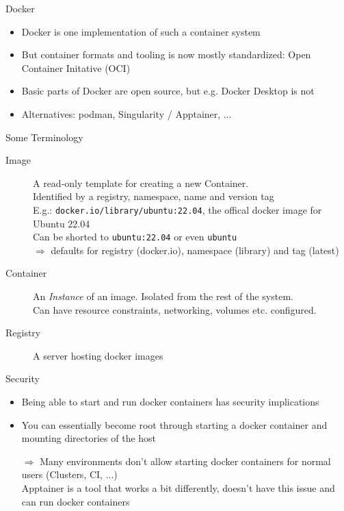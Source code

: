 \documentclass[aspectratio=1610]{beamer}
\begin{document}
\begin{frame}{Docker}
  \begin{itemize}
    \item Docker is one implementation of such a container system
    \item But container formats and tooling is now mostly standardized: Open Container Initative (OCI)
    \item Basic parts of Docker are open source, but e.g. Docker Desktop is not
    \item Alternatives: podman, Singularity / Apptainer, ...
  \end{itemize}
\end{frame}


\begin{frame}{Some Terminology}
  \begin{description}
    \item[Image] A read-only template for creating a new Container. \\
      Identified by a registry, namespace, name and version tag \\
      E.g.: \texttt{docker.io/library/ubuntu:22.04}, the offical docker image for Ubuntu 22.04 \\
      Can be shorted to \texttt{ubuntu:22.04} or even \texttt{ubuntu} \\ $⇒$ defaults for registry (docker.io), namespace (library) and tag (latest)
    \item[Container] An \emph{Instance} of an image. Isolated from the rest of the system. \\
      Can have resource constraints, networking, volumes etc. configured.
    \item[Registry] A server hosting docker images
  \end{description}
\end{frame}

\begin{frame}{Security}
  \begin{itemize}
    \item Being able to start and run docker containers has security implications
    \item You can essentially become root through starting a docker container and mounting directories of the host
    \item[$⇒$] Many environments don't allow starting docker containers for normal users (Clusters, CI, ...) \\
      Apptainer is a tool that works a bit differently, doesn't have this issue and can run docker containers
  \end{itemize}
\end{frame}
\end{document}
